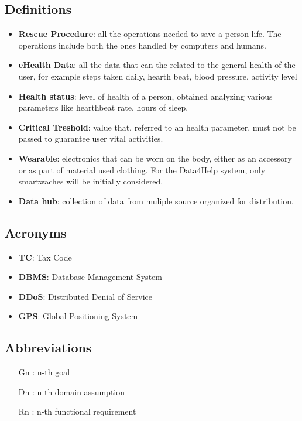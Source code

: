 \subsection{Definitions}
\begin{itemize}
\item \textbf{Rescue Procedure}: all the operations needed to save a person life. The operations include both the ones handled by computers and humans.
\item \textbf{eHealth Data}: all the data that can the related to the general health of the user, for example steps taken daily, hearth beat, blood pressure, activity level
\item \textbf{Health status}: level of health of a person, obtained analyzing various parameters like  hearthbeat rate, hours of sleep.
\item \textbf{Critical Treshold}: value that, referred to an health parameter, must not be passed to guarantee user vital activities.
\item \textbf{Wearable}: electronics that can be worn on the body, either as an accessory or as part of material used clothing. For the Data4Help system, only smartwaches will be initially considered.
\item \textbf{Data hub}: collection of data from muliple source organized for distribution.
\end{itemize}




\subsection{Acronyms}

\begin{itemize}
\item \textbf{TC}: Tax Code
\item \textbf{DBMS}: Database Management System
\item \textbf{DDoS}: Distributed Denial of Service
\item \textbf{GPS}: Global Positioning System
\end{itemize}

\subsection{Abbreviations}
\begin{itemize}
\item[Gn]: n-th goal
\item[Dn]: n-th domain assumption
\item[Rn]: n-th functional requirement
\end{itemize}



